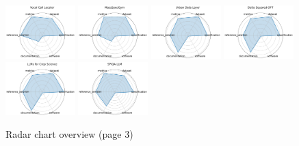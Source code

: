 \documentclass{article}
\begin{document}
\begin{figure}[ht!]
\centering
\includegraphics[width=0.2400\textwidth]{Vocal Call Locator_radar.pdf}
\includegraphics[width=0.2400\textwidth]{MassSpecGym_radar.pdf}
\includegraphics[width=0.2400\textwidth]{Urban Data Layer_radar.pdf}
\includegraphics[width=0.2400\textwidth]{Delta Squared-DFT_radar.pdf}
\\[1ex]
\includegraphics[width=0.2400\textwidth]{LLMs for Crop Science_radar.pdf}
\includegraphics[width=0.2400\textwidth]{SPIQA LLM_radar.pdf}
\caption{Radar chart overview (page 3)}
\end{figure}
\end{document}
